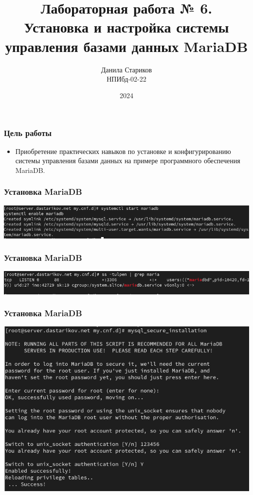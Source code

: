 

\title{Лабораторная работа № 6. \\Установка и настройка системы управления базами данных MariaDB}
\author{Данила Стариков \\ НПИбд-02-22}
\date{2024}



\frame{\titlepage}

\begin{frame}
\frametitle{Цель работы}
\begin{itemize}
    \item Приобретение практических навыков по установке и конфигурированию системы управления базами данных на примере программного обеспечения MariaDB.
\end{itemize}
\end{frame}

\begin{frame}
\frametitle{Установка MariaDB}
    \centering
    \includegraphics[width=\textwidth]{../images/image01.png}
\end{frame}

\begin{frame}
\frametitle{Установка MariaDB}
    \centering
    \includegraphics[width=\textwidth]{../images/image02.png}
\end{frame}

\begin{frame}
\frametitle{Установка MariaDB}
    \centering
    \includegraphics[width=\textwidth]{../images/image03.png}
\end{frame}

